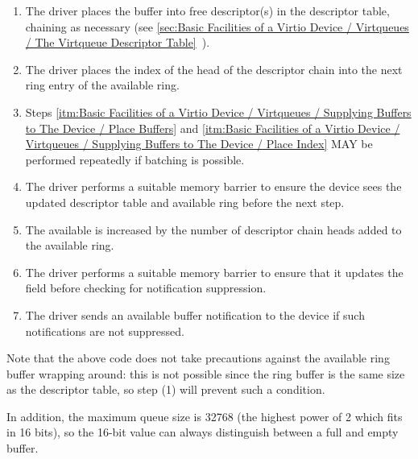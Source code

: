 \begin{enumerate}
\item\label{itm:Basic Facilities of a Virtio Device / Virtqueues / Supplying Buffers to The Device / Place Buffers} The driver places the buffer into free descriptor(s) in the
   descriptor table, chaining as necessary (see \ref{sec:Basic Facilities of a Virtio Device / Virtqueues / The Virtqueue Descriptor Table}~).

\item\label{itm:Basic Facilities of a Virtio Device / Virtqueues / Supplying Buffers to The Device / Place Index} The driver places the index of the head of the descriptor chain
   into the next ring entry of the available ring.

\item Steps \ref{itm:Basic Facilities of a Virtio Device / Virtqueues / Supplying Buffers to The Device / Place Buffers} and \ref{itm:Basic Facilities of a Virtio Device / Virtqueues / Supplying Buffers to The Device / Place Index} MAY be performed repeatedly if batching
  is possible.

\item The driver performs a suitable memory barrier to ensure the device sees
  the updated descriptor table and available ring before the next
  step.

\item The available  is increased by the number of
  descriptor chain heads added to the available ring.

\item The driver performs a suitable memory barrier to ensure that it updates
  the  field before checking for notification suppression.

\item The driver sends an available buffer notification to the device if
    such notifications are not suppressed.
\end{enumerate}

Note that the above code does not take precautions against the
available ring buffer wrapping around: this is not possible since
the ring buffer is the same size as the descriptor table, so step
(1) will prevent such a condition.

In addition, the maximum queue size is 32768 (the highest power
of 2 which fits in 16 bits), so the 16-bit  value can always
distinguish between a full and empty buffer.

